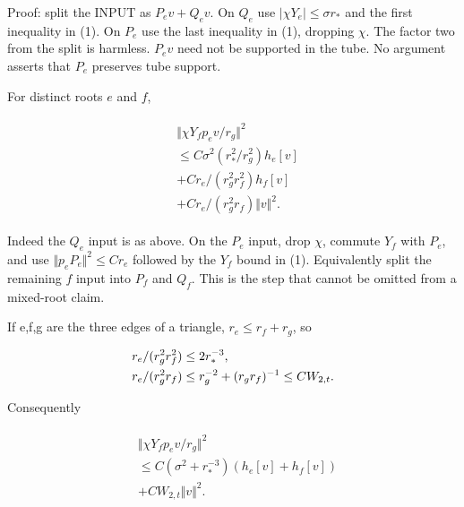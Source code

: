 Proof: split the INPUT as \(P_{e} v+Q_{e} v\). On \(Q_{e}\) use
\(\vert \chi  Y_{e}\vert \le \sigma  r_{*}\) and the first inequality in
(1). On \(P_{e}\) use the last inequality in (1), dropping \(\chi\). The
factor two from the split is harmless. \(P_{e} v\) need not be supported
in the tube. No argument asserts that \(P_{e}\) preserves tube support.

For distinct roots \(e\) and \(f\),

\begin{gather*}
\begin{aligned}
& \Vert \chi  Y_{f} p_{e} v/r_{g}\Vert ^{2} \\
& \le  C \sigma ^{2} (r_{*}^{2}/r_{g}^{2}) h_{e}[v] \\
& + C r_{e}/(r_{g}^{2} r_{f}^{2}) h_{f}[v] \\
& + C r_{e}/(r_{g}^{2} r_{f}) \Vert v\Vert ^{2}.
\end{aligned}\tag{3}
\end{gather*}

Indeed the \(Q_{e}\) input is as above. On the \(P_{e}\) input, drop
\(\chi\), commute \(Y_{f}\) with \(P_{e}\), and use
\(\Vert p_{e} P_{e}\Vert ^{2}\le C r_{e}\) followed by the \(Y_{f}\)
bound in (1). Equivalently split the remaining \(f\) input into
\(P_{f}\) and \(Q_{f}\). This is the step that cannot be omitted from a
mixed-root claim.

If e,f,g are the three edges of a triangle, \(r_{e}\le r_{f}+r_{g}\), so

\begin{gather*}
\begin{aligned}
& r_{e}/(r_{g}^{2} r_{f}^{2}) \le  2 r_{*}^{-3}, \\
& r_{e}/(r_{g}^{2} r_{f}) \le  r_{g}^{-2}+(r_{g} r_{f})^{-1} \le  C W_{2,t}.
\end{aligned}\notag
\end{gather*}

Consequently

\begin{gather*}
\begin{aligned}
& \Vert \chi  Y_{f} p_{e} v/r_{g}\Vert ^{2} \\
& \le  C (\sigma ^{2}+r_{*}^{-3}) (h_{e}[v]+h_{f}[v]) \\
& + C W_{2,t} \Vert v\Vert ^{2}.
\end{aligned}\tag{4}
\end{gather*}

